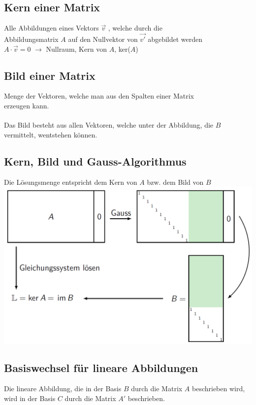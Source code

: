 		  	
		  	\subsection{Kern einer Matrix}		
			Alle Abbildungen eines Vektors $\vec{v}$ , welche durch die \\
			Abbildungsmatrix $A$ auf den Nullvektor von $\vec{v'}$ abgebildet werden \\
			$A \cdot \vec{v} = 0 $ $\rightarrow$ Nullraum, Kern von $A$, ker($A$) 
			
			
			\subsection{Bild einer Matrix}		
			Menge der Vektoren, welche man aus den Spalten einer Matrix \\
			erzeugen kann.\\
			\\
			Das Bild besteht aus allen Vektoren, welche unter der Abbildung, die $B$ vermittelt, wentstehen können.
			
			
			
			
			\subsection{Kern, Bild und Gauss-Algorithmus}	
			Die Lösungsmenge entspricht dem Kern von $A$ bzw. dem Bild von $B$ \\	
			\includegraphics[width=0.55\linewidth]{Bilder/kern-bild-gauss} 	
			
			
			\subsection{Basiswechsel für lineare Abbildungen}
			Die lineare Abbildung, die in der Basis $B$ durch die Matrix $A$ beschrieben wird, wird in der Basis $C$ durch die Matrix $A'$ beschrieben.\\
			
